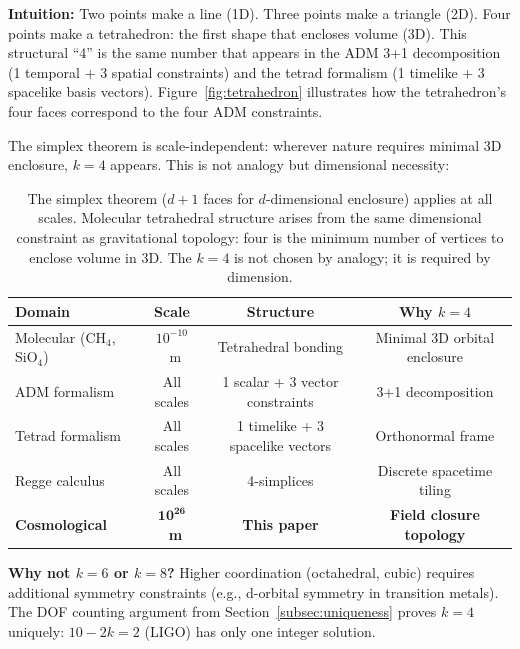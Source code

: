 \documentclass[aps,prd,preprint,superscriptaddress,showpacs,preprintnumbers,amsmath,amssymb,nofootinbib]{revtex4-2}
\begin{document}
\textbf{Intuition:} Two points make a line (1D). Three points make a triangle (2D). Four points make a tetrahedron: the first shape that encloses volume (3D). This structural ``4'' is the same number that appears in the ADM 3+1 decomposition (1 temporal + 3 spatial constraints) and the tetrad formalism (1 timelike + 3 spacelike basis vectors). Figure~\ref{fig:tetrahedron} illustrates how the tetrahedron's four faces correspond to the four ADM constraints.

The simplex theorem is scale-independent: wherever nature requires minimal 3D enclosure, $k=4$ appears. This is not analogy but dimensional necessity:

\begin{table}[H]
\centering
\begin{tabular*}{\textwidth}{@{\extracolsep{\fill}} lccc @{}}
\toprule
\textbf{Domain} & \textbf{Scale} & \textbf{Structure} & \textbf{Why $k=4$} \\
\midrule
Molecular (CH$_4$, SiO$_4$) & $10^{-10}$~m & Tetrahedral bonding & Minimal 3D orbital enclosure \\
ADM formalism & All scales & 1 scalar + 3 vector constraints & 3+1 decomposition \\
Tetrad formalism & All scales & 1 timelike + 3 spacelike vectors & Orthonormal frame \\
Regge calculus & All scales & 4-simplices & Discrete spacetime tiling \\
\textbf{Cosmological} & $\mathbf{10^{26}}$~\textbf{m} & \textbf{This paper} & \textbf{Field closure topology} \\
\bottomrule
\end{tabular*}
\caption{The simplex theorem ($d+1$ faces for $d$-dimensional enclosure) applies at all scales. Molecular tetrahedral structure arises from the same dimensional constraint as gravitational topology: four is the minimum number of vertices to enclose volume in 3D. The $k=4$ is not chosen by analogy; it is required by dimension.}
\label{tab:k4examples}
\end{table}

\textbf{Why not $k=6$ or $k=8$?} Higher coordination (octahedral, cubic) requires additional symmetry constraints (e.g., d-orbital symmetry in transition metals). The DOF counting argument from Section~\ref{subsec:uniqueness} proves $k=4$ uniquely: $10 - 2k = 2$ (LIGO) has only one integer solution.
\end{document}
